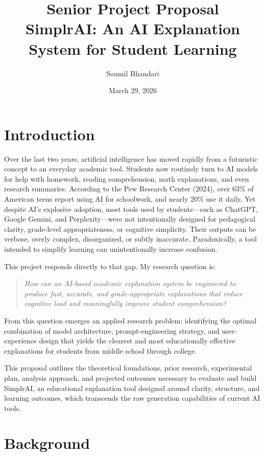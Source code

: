 \documentclass[11pt]{article}
\title{\textbf{Senior Project Proposal}\\[0.35em]
\large SimplrAI: An AI Explanation System for Student Learning}
\author{Soumil Bhandari}
\date{March 29, 2026}
\begin{document}
\maketitle

\section*{Introduction}

Over the last two years, artificial intelligence has moved rapidly from a
futuristic concept to an everyday academic tool. Students now routinely turn
to AI models for help with homework, reading comprehension, math explanations,
and even research summaries. According to the Pew Research Center (2024), over
63\% of American teens report using AI for schoolwork, and nearly 20\% use it
daily. Yet despite AI's explosive adoption, most tools used by students---such
as ChatGPT, Google Gemini, and Perplexity---were not intentionally designed for
pedagogical clarity, grade-level appropriateness, or cognitive simplicity.
Their outputs can be verbose, overly complex, disorganized, or subtly
inaccurate. Paradoxically, a tool intended to simplify learning can
unintentionally increase confusion.

This project responds directly to that gap. My research question is:

\begin{quote}
\itshape
How can an AI-based academic explanation system be engineered to produce fast,
accurate, and grade-appropriate explanations that reduce cognitive load and
meaningfully improve student comprehension?
\end{quote}

From this question emerges an applied research problem: identifying the optimal
combination of model architecture, prompt-engineering strategy, and
user-experience design that yields the clearest and most educationally
effective explanations for students from middle school through college.

This proposal outlines the theoretical foundations, prior research, experimental
plan, analysis approach, and projected outcomes necessary to evaluate and build
SimplrAI, an educational explanation tool designed around clarity, structure,
and learning outcomes, which transcends the raw generation capabilities of
current AI tools.

\section*{Background}
\end{document}
